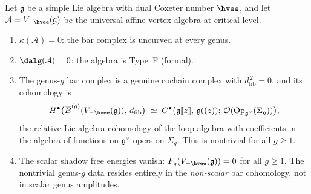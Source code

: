 \documentclass[11pt]{article}
\newcommand{\cA}{\mathcal{A}}
\newcommand{\cO}{\mathcal{O}}
\newcommand{\fg}{\mathfrak{g}}
\newcommand{\barB}{\overline{B}}
\newcommand{\dfib}{d_{\mathrm{fib}}}
\providecommand{\llbracket}{\mathopen{[\![}}
\providecommand{\rrbracket}{\mathclose{]\!]}}
\begin{document}
\begin{theorem}
\label{thm:critical-level-nontrivial}
Let $\fg$ be a simple Lie algebra with dual Coxeter number
$\hvee$, and let $\cA = V_{-\hvee}(\fg)$ be the universal
affine vertex algebra at critical level.
\begin{enumerate}[label=\textup{(\roman*)}]
\item $\kappa(\cA) = 0$: the bar complex is uncurved at
  every genus.
\item $\dalg(\cA) = 0$: the algebra is Type~F (formal).
\item The genus-$g$ bar complex is a genuine cochain complex
  with $\dfib^{\,2} = 0$, and its cohomology is
  \[
  H^\bullet\bigl(\barB^{(g)}(V_{-\hvee}(\fg)),\, \dfib\bigr)
  \;\simeq\;
  C^\bullet\bigl(\fg\llbracket z \rrbracket,\,
  \fg((z));\, \cO(\mathrm{Op}_{\fg^\vee}(\Sigma_g))\bigr),
  \]
  the relative Lie algebra cohomology of the loop algebra
  with coefficients in the algebra of functions on
  $\fg^\vee$-opers on $\Sigma_g$.  This is nontrivial for
  all $g \geq 1$.
\item The scalar shadow free energies vanish:
  $F_g(V_{-\hvee}(\fg)) = 0$ for all $g \geq 1$.
  The nontrivial genus-$g$ data resides entirely in the
  \emph{non-scalar} bar cohomology, not in scalar genus
  amplitudes.
\end{enumerate}
\end{theorem}
\end{document}
